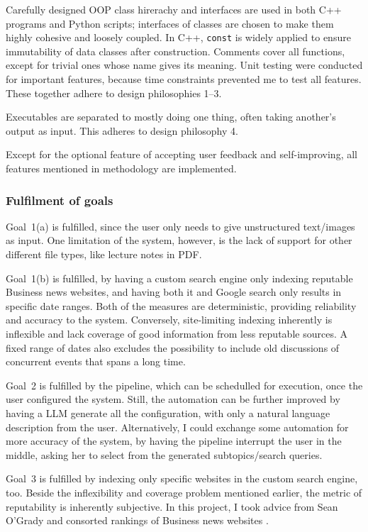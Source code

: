 \documentclass[final-report]{report-template}
\begin{document}
Carefully designed OOP class hirerachy and interfaces are used in both C++
programs and Python scripts; interfaces of classes are chosen to make them
highly cohesive and loosely coupled. In C++, \texttt{const} is widely applied
to ensure immutability of data classes after construction. Comments cover all
functions, except for trivial ones whose name gives its meaning. Unit testing
were conducted for important features, because time constraints prevented me
to test all features. These together adhere to design philosophies 1--3.

Executables are separated to mostly doing one thing, often taking another's
output as input. This adheres to design philosophy 4.

Except for the optional feature of accepting user feedback and self-improving,
all features mentioned in methodology are implemented. 

\subsubsection{Fulfilment of goals}
Goal~1(a) is fulfilled, since the user only needs to give unstructured
text/images as input. One limitation of the system, however, is the lack of
support for other different file types, like lecture notes in PDF.

Goal~1(b) is fulfilled, by having a custom search engine only indexing
reputable Business news websites, and having both it and Google search only
results in specific date ranges. Both of the measures are deterministic,
providing reliability and accuracy to the system. Conversely, site-limiting
indexing inherently is inflexible and lack coverage of good information from
less reputable sources. A fixed range of dates also excludes the possibility to
include old discussions of concurrent events that spans a long time.

Goal~2 is fulfilled by the pipeline, which can be schedulled for execution,
once the user configured the system. Still, the automation can be further
improved by having a LLM generate all the configuration, with only a natural
language description from the user. Alternatively, I could exchange some
automation for more accuracy of the system, by having the pipeline interrupt
the user in the middle, asking her to select from the generated
subtopics/search queries.

Goal~3 is fulfilled by indexing only specific websites in the custom search
engine, too. Beside the inflexibility and coverage problem mentioned earlier,
the metric of reputability is inherently subjective. In this project, I took
advice from Sean O'Grady and consorted rankings of Business news
websites \cite{business.news.ranking.1, business.news.ranking.2}.
\end{document}
